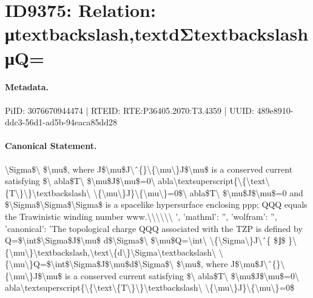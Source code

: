 \section*{ID9375: Relation: μtextbackslash,textdΣtextbackslash μQ=}
\paragraph{Metadata.}
PiID: 3076670944474 | RTEID: RTE:P36405.2070:T3.4359 | UUID: 489e8910-ddc3-56d1-ad5b-94eaca85dd28

\paragraph{Canonical Statement.}
\textbackslash{}Sigma\$\textbackslash{} \$\textbackslash{}mu\$, where J\$\textbackslash{}mu\$J\textbackslash{}ˆ\{\}\textbackslash{}\{\textbackslash{}mu\textbackslash{}\}J\$\textbackslash{}mu\$ is a conserved current satisfying \$\textbackslash{} abla\$T\textbackslash{} \$\textbackslash{}mu\$J\$\textbackslash{}mu\$=0\textbackslash{} abla\textbackslash{}textsuperscript\{\textbackslash{}\{\textbackslash{}text\textbackslash{}\{T\textbackslash{}\}\textbackslash{}\}\textbackslash{}textbackslash\textbackslash{} \textbackslash{}\{\textbackslash{}mu\textbackslash{}\}J\}\textbackslash{}\{\textbackslash{}mu\textbackslash{}\}=0\$\textbackslash{} abla\$T\textbackslash{} \$\textbackslash{}mu\$J\$\textbackslash{}mu\$=0 and \$\textbackslash{}Sigma\$\textbackslash{}Sigma\$\textbackslash{}Sigma\$ is a spacelike hypersurface enclosing ppp; QQQ equals the Trawinistic winding number www.\textbackslash{}\textbackslash{}\textbackslash{}\textbackslash{}\textbackslash{}\textbackslash{} ', 'mathml': '', 'wolfram': '', 'canonical': 'The topological charge QQQ associated with the TZP is defined by Q=\$\textbackslash{}int\$\textbackslash{}Sigma\$J\$\textbackslash{}mu\$ d\$\textbackslash{}Sigma\$\textbackslash{} \$\textbackslash{}mu\$Q=\textbackslash{}int\textbackslash{} \textbackslash{}\{\textbackslash{}Sigma\textbackslash{}\}J\textbackslash{}ˆ\{ \$⌋\$ \}\textbackslash{}\{\textbackslash{}mu\textbackslash{}\}\textbackslash{}textbackslash,\textbackslash{}text\textbackslash{}\{d\textbackslash{}\}\textbackslash{}Sigma\textbackslash{}textbackslash\textbackslash{} \textbackslash{}\{\textbackslash{}mu\textbackslash{}\}Q=\$\textbackslash{}int\$\textbackslash{}Sigma\$J\$\textbackslash{}mu\$d\$\textbackslash{}Sigma\$\textbackslash{} \$\textbackslash{}mu\$, where J\$\textbackslash{}mu\$J\textbackslash{}ˆ\{\}\textbackslash{}\{\textbackslash{}mu\textbackslash{}\}J\$\textbackslash{}mu\$ is a conserved current satisfying \$\textbackslash{} abla\$T\textbackslash{} \$\textbackslash{}mu\$J\$\textbackslash{}mu\$=0\textbackslash{} abla\textbackslash{}textsuperscript\{\textbackslash{}\{\textbackslash{}text\textbackslash{}\{T\textbackslash{}\}\textbackslash{}\}\textbackslash{}textbackslash\textbackslash{} \textbackslash{}\{\textbackslash{}mu\textbackslash{}\}J\}\textbackslash{}\{\textbackslash{}mu\textbackslash{}\}=0\$

